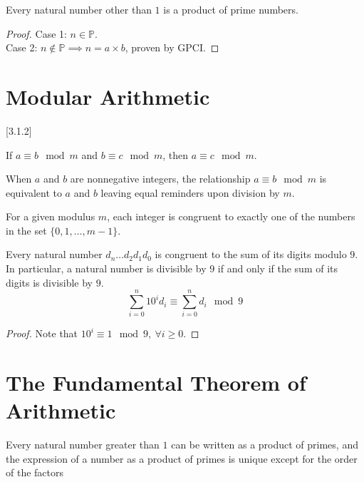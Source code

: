 \documentclass[11pt]{article}
\begin{document}
		\begin{theorem}[2.2.4]
			Every natural number other than $1$ is a product of prime numbers.
		\end{theorem}
		\begin{proof}
			Case 1: $n \in \mathbb{P}$. \\
			Case 2: $n \notin \mathbb{P} \implies n = a\times b$, proven by GPCI.
		\end{proof}
		
	\section{Modular Arithmetic}[3.1.2]
		\begin{theorem}
			If $a \equiv b \mod m$ and $b \equiv c \mod m$, then $a \equiv c \mod m$.
		\end{theorem}
		
		\begin{theorem}[3.1.3]
			When $a$ and $b$ are nonnegative integers, the relationship $a \equiv b \mod m$ is equivalent to $a$ and $b$ leaving equal reminders upon division by $m$.
		\end{theorem}
		
		\begin{theorem}[3.1.4]
			For a given modulus $m$, each integer is congruent to exactly one of the numbers in the set $\{0, 1, \dots, m-1\}$.
		\end{theorem}
		
		\begin{theorem}[3.2.1]
			Every natural number $d_n \dots d_2 d_1 d_0$ is congruent to the sum of its digits modulo $9$. In particular, a natural number is divisible by $9$ if and only if the sum of its digits is divisible by $9$.
			\[
				\sum_{i=0}^n {10^i d_i} \equiv \sum_{i=0}^n{d_i} \mod 9
			\]
		\end{theorem}
		\begin{proof}
			Note that $10^i \equiv 1 \mod 9,\ \forall i \geq 0$.
		\end{proof}
		
	\section{The Fundamental Theorem of Arithmetic}
		\begin{theorem}
			Every natural number greater than $1$ can be written as a product of primes, and the expression of a number as a product of primes is unique except for the order of the factors
		\end{theorem}
	
\end{document}
